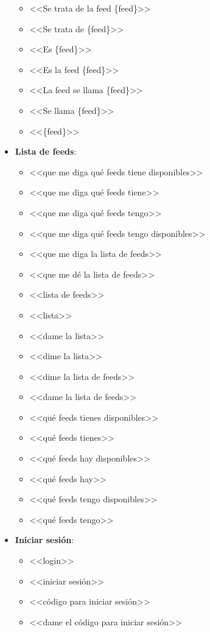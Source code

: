 \documentclass[11pt,spanish,listoffigures,listoftables,table,hyphens,dvipsnames]{tfgetsinf}
\begin{document}
\begin{itemize}
\begin{itemize}
      \item <<Se trata de la feed \{feed\}>>
      \item <<Se trata de \{feed\}>>
      \item <<Es \{feed\}>>
      \item <<Es la feed \{feed\}>>
      \item <<La feed se llama \{feed\}>>
      \item <<Se llama \{feed\}>>
      \item <<\{feed\}>>
   \end{itemize}
   \item \textbf{Lista de feeds}:
   \begin{itemize}
      \item <<que me diga qué feeds tiene disponibles>>
      \item <<que me diga qué feeds tiene>>
      \item <<que me diga qué feeds tengo>>
      \item <<que me diga qué feeds tengo disponibles>>
      \item <<que me diga la lista de feeds>>
      \item <<que me dé la lista de feeds>>
      \item <<lista de feeds>>
      \item <<lista>>
      \item <<dame la lista>>
      \item <<dime la lista>>
      \item <<dime la lista de feeds>>
      \item <<dame la lista de feeds>>
      \item <<qué feeds tienes disponibles>>
      \item <<qué feeds tienes>>
      \item <<qué feeds hay disponibles>>
      \item <<qué feeds hay>>
      \item <<qué feeds tengo disponibles>>
      \item <<qué feeds tengo>>
   \end{itemize}
   \item \textbf{Iniciar sesión}:
   \begin{itemize}
      \item <<login>>
      \item <<iniciar sesión>>
      \item <<código para iniciar sesión>>
      \item <<dame el código para iniciar sesión>>

\end{itemize}
\end{itemize}
\end{document}
